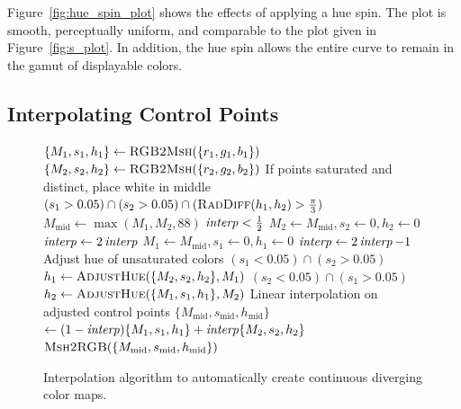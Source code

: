 \documentclass[review,journal]{vgtc}         %
\begin{document}
Figure~\ref{fig:hue_spin_plot} shows the effects of applying a hue spin.
The plot is smooth, perceptually uniform, and comparable to the plot given
in Figure~\ref{fig:s_plot}.  In addition, the hue spin allows the entire
curve to remain in the gamut of displayable colors.


\subsection{Interpolating Control Points}
\label{sec:InterpolatingControlPoints}

\begin{figure}
  \begin{codebox}
    \li $\{M_1,s_1,h_1\} \leftarrow \textnormal{\scshape RGB2Msh}(\{r_1,g_1,b_1\})$
    \li $\{M_2,s_2,h_2\} \leftarrow \textnormal{\scshape RGB2Msh}(\{r_2,g_2,b_2\})$
    \zi \Comment If points saturated and distinct, place white in middle
    \li \If $(s_1 > 0.05) \cap (s_2 > 0.05)
             \cap (\textnormal{\scshape RadDiff}(h_1,h_2) > \frac{\pi}{3})$
	\label{code:InterpolateColor:AddWhiteBegin}
    \li \Then $M_{\mathrm{mid}} \leftarrow \max(M_1,M_2,88)$
    \li       \If $\id{interp} < \frac{1}{2}$
    \li       \Then $M_2 \leftarrow M_{\mathrm{mid}}, s_2 \leftarrow 0, h_2 \leftarrow 0$
    \li             $\id{interp} \leftarrow 2\id{interp}$
    \li       \Else $M_1 \leftarrow M_{\mathrm{mid}}, s_1 \leftarrow 0, h_1 \leftarrow 0$
    \li             $\id{interp} \leftarrow 2\id{interp} - 1$
              \End
        \End
	\label{code:InterpolateColor:AddWhiteEnd}
    \zi \Comment Adjust hue of unsaturated colors
    \li \If $(s_1 < 0.05) \cap (s_2 > 0.05)$
        \label{code:InterpolateColor:AdjustHueBegin}
    \li \Then $h_1 \leftarrow \textnormal{\scshape AdjustHue}(\{M_2,s_2,h_2\},M_1)$
    \li \ElseIf $(s_2 < 0.05) \cap (s_1 > 0.05)$
    \li \Then $h_2 \leftarrow \textnormal{\scshape AdjustHue}(\{M_1,s_1,h_1\},M_2)$
        \End
	\label{code:InterpolateColor:AdjustHueEnd}
    \zi \Comment Linear interpolation on adjusted control points
    \li $\{M_\mathrm{mid},s_\mathrm{mid},h_\mathrm{mid}\}$
    \zi \>$\leftarrow (1-\id{interp})\{M_1,s_1,h_1\}+\id{interp}\{M_2,s_2,h_2\}$
        \label{code:InterpolateColor:LinearInterpolate}
    \li \Return $\textnormal{\scshape Msh2RGB}(\{M_\mathrm{mid},s_\mathrm{mid},h_\mathrm{mid}\})$
  \end{codebox}
  \caption{Interpolation algorithm to automatically create continuous
    diverging color maps.}
  \label{fig:InterpolateColor}
\end{figure}
\end{document}

